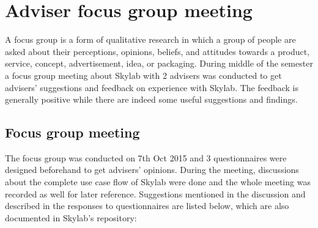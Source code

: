 \chapter{Adviser focus group meeting} \label{focusgroupmeeting}

A focus group is a form of qualitative research in which a group of people are asked about their perceptions, opinions, beliefs, and attitudes towards a product, service, concept, advertisement, idea, or packaging\cite{citation15}. During middle of the semester a focus group meeting about Skylab with 2 advisers was conducted to get advisers' suggestions and feedback on experience with Skylab. The feedback is generally positive while there are indeed some useful suggestions and findings.

\section{Focus group meeting}

The focus group was conducted on 7th Oct 2015 and 3 questionnaires were designed beforehand to get advisers' opinions. During the meeting, discussions about the complete use case flow of Skylab were done and the whole meeting was recorded as well for later reference. Suggestions mentioned in the discussion and described in the responses to questionnaires are listed below, which are also documented in Skylab's repository:

